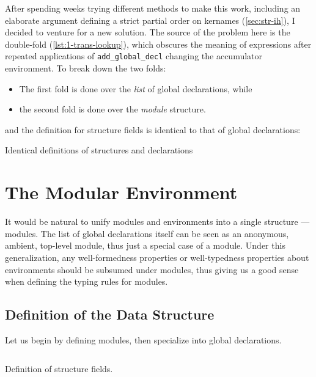 After spending weeks trying different methods to make this work, including an
elaborate argument defining a strict partial order on kernames
(\ref{sec:str-ih}), I decided to venture for a new solution. The source of the
problem here is the double-fold (\ref{lst:1-trans-lookup}), which obscures the
meaning of expressions after repeated applications of \verb|add_global_decl|
changing the accumulator environment. To break down the two folds:

\begin{itemize}
  \item The first fold is done over the \emph{list} of global declarations,
  while
  \item the second fold is done over the \emph{module} structure.
\end{itemize}

and the definition for structure fields is identical to that of global
declarations: 

\begin{listing}[H]
  \caption{Identical definitions of structures and declarations}
  \label{lst:2-st-gd-id}
\end{listing}


\section{The Modular Environment}
\newcommand{\tcc}[3]{\inputminted[firstline={#1},lastline={#2},linenos]{Coq}{
  code/v2/template-coq/theories/#3}}
\newcommand{\pcuicc}[3]{\inputminted[firstline={#1},lastline={#2},linenos]{Coq}{
  code/v2/pcuic/theories/#3}}

It would be natural to unify modules and environments into a single structure
--- modules. The list of global declarations itself can be seen as an anonymous,
ambient, top-level module, thus just a special case of a module. Under this
generalization, any well-formedness properties or well-typedness properties
about environments should be subsumed under modules, thus giving us a good sense
when defining the typing rules for modules.

\subsection{Definition of the Data Structure}
Let us begin by defining modules, then specialize into global declarations.

\begin{listing}[H]
\tcc{325}{338}{Environment.v}
  \caption{Definition of structure fields.}
  \label{lst:2-def-sf}
\end{listing}

